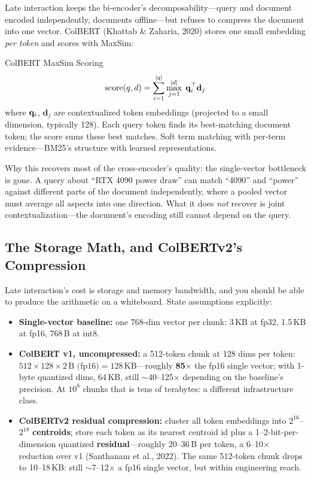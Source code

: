 Late interaction keeps the bi-encoder's decomposability---query and document encoded independently, documents offline---but refuses to compress the document into one vector. ColBERT (Khattab \& Zaharia, 2020) stores one small embedding \textit{per token} and scores with MaxSim:

\begin{mathresult}{ColBERT MaxSim Scoring}
\[
\text{score}(q, d) = \sum_{i=1}^{|q|} \max_{j=1}^{|d|} \; \mathbf{q}_i^\top \mathbf{d}_j
\]
where $\mathbf{q}_i$, $\mathbf{d}_j$ are contextualized token embeddings (projected to a small dimension, typically 128). Each query token finds its best-matching document token; the score sums these best matches. Soft term matching with per-term evidence---BM25's structure with learned representations.
\end{mathresult}

Why this recovers most of the cross-encoder's quality: the single-vector bottleneck is gone. A query about ``RTX 4090 power draw'' can match ``4090'' and ``power'' against different parts of the document independently, where a pooled vector must average all aspects into one direction. What it does \textit{not} recover is joint contextualization---the document's encoding still cannot depend on the query.

\subsection{The Storage Math, and ColBERTv2's Compression}
\label{sr:subsec:colbert_storage}

Late interaction's cost is storage and memory bandwidth, and you should be able to produce the arithmetic on a whiteboard. State assumptions explicitly:

\begin{itemize}
    \item \textbf{Single-vector baseline:} one 768-dim vector per chunk: 3\,KB at fp32, 1.5\,KB at fp16, 768\,B at int8.
    \item \textbf{ColBERT v1, uncompressed:} a 512-token chunk at 128 dims per token: $512 \times 128 \times 2\,\text{B (fp16)} = 128$\,KB---roughly \textbf{85$\times$} the fp16 single vector; with 1-byte quantized dims, 64\,KB, still $\sim$40--125$\times$ depending on the baseline's precision. At $10^8$ chunks that is tens of terabytes: a different infrastructure class.
    \item \textbf{ColBERTv2 residual compression:} cluster all token embeddings into $2^{16}$--$2^{18}$ \textbf{centroids}; store each token as its nearest centroid id plus a 1--2-bit-per-dimension quantized \textbf{residual}---roughly 20--36\,B per token, a 6--10$\times$ reduction over v1 (Santhanam et al., 2022). The same 512-token chunk drops to 10--18\,KB: still $\sim$7--12$\times$ a fp16 single vector, but within engineering reach.
\end{itemize}

